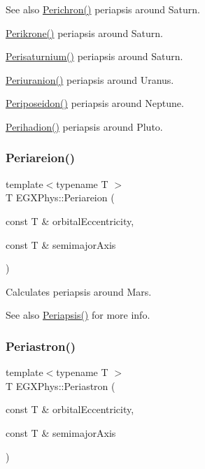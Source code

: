 \begin{DoxySeeAlso}{See also}
\mbox{\hyperlink{group___e_g_x_phys-_periapsis_ga12b5e99aa2e3e7031ef6ce93060cf516}{Perichron()}} periapsis around Saturn. 

\mbox{\hyperlink{group___e_g_x_phys-_periapsis_gaa56f74c44a3583b8f0d13b821c1d7422}{Perikrone()}} periapsis around Saturn. 

\mbox{\hyperlink{group___e_g_x_phys-_periapsis_ga60a50d09d29ebe47cbbfc125c2ea42bf}{Perisaturnium()}} periapsis around Saturn. 

\mbox{\hyperlink{group___e_g_x_phys-_periapsis_gab8b8131a617dd2d2a4de1d48accd7442}{Periuranion()}} periapsis around Uranus. 

\mbox{\hyperlink{group___e_g_x_phys-_periapsis_ga237e7af3794202c67e65f64f4c8abc2a}{Periposeidon()}} periapsis around Neptune. 

\mbox{\hyperlink{group___e_g_x_phys-_periapsis_gafb16e46e55078b38604eef0d7c7c40c4}{Perihadion()}} periapsis around Pluto. 
\end{DoxySeeAlso}
\mbox{\label{group___e_g_x_phys-_periapsis_ga0617ba07a30b0fd0544c02f691bfae26}} 
\subsubsection{\texorpdfstring{Periareion()}{Periareion()}}
{\footnotesize\ttfamily template$<$typename T $>$ \\
T E\+G\+X\+Phys\+::\+Periareion (\begin{DoxyParamCaption}\item[{const T \&}]{orbital\+Eccentricity,  }\item[{const T \&}]{semimajor\+Axis }\end{DoxyParamCaption})}



Calculates periapsis around Mars. 

\begin{DoxySeeAlso}{See also}
\mbox{\hyperlink{group___e_g_x_phys-_periapsis_ga4414ac75539371ec874a3d25cad6c9fe}{Periapsis()}} for more info. 
\end{DoxySeeAlso}
\mbox{\label{group___e_g_x_phys-_periapsis_ga477de6824cbb5986cdae923141e21648}} 
\subsubsection{\texorpdfstring{Periastron()}{Periastron()}}
{\footnotesize\ttfamily template$<$typename T $>$ \\
T E\+G\+X\+Phys\+::\+Periastron (\begin{DoxyParamCaption}\item[{const T \&}]{orbital\+Eccentricity,  }\item[{const T \&}]{semimajor\+Axis }\end{DoxyParamCaption})}



